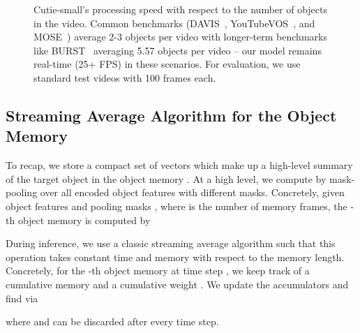 \begin{figure}
    \centering
         \caption{Cutie-small's processing speed with respect to the number of objects in the video. Common benchmarks (DAVIS~\cite{perazzi2016benchmark}, YouTubeVOS~\cite{xu2018youtubeVOS}, and MOSE~\cite{ding2023mose}) average 2-3 objects per video with longer-term benchmarks like BURST~\cite{athar2023burst} averaging 5.57 objects per video -- our model remains real-time (25+ FPS) in these scenarios.
    For evaluation, we use standard  test videos with 100 frames each.
    }
\label{fig:app:plot-fps_vs_num_objects}
\end{figure}

\subsection{Streaming Average Algorithm for the Object Memory}
To recap, we store a compact set of  vectors which make up a high-level summary of the target object in the object memory .
At a high level, we compute  by mask-pooling over all encoded object features with  different masks. Concretely, given object features  and  pooling masks , where  is the number of memory frames, the -th object memory  is computed by


During inference, we use a classic streaming average algorithm such that this operation takes constant time and memory with respect to the memory length. 
Concretely, for the -th object memory at time step , we keep track of a cumulative memory  and a cumulative weight . 
We update the accumulators and find  via

where  and  can be discarded after every time step.


